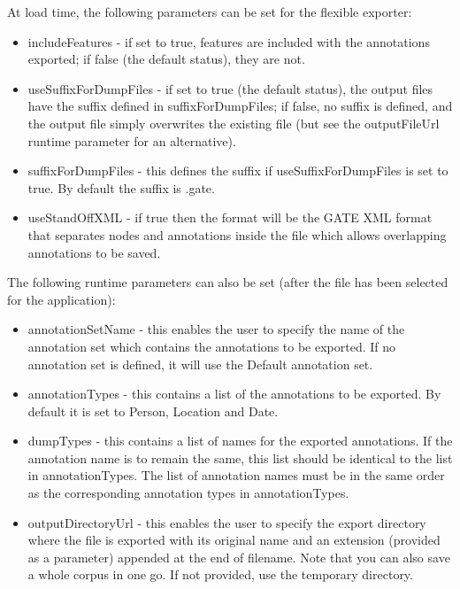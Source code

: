At load time, the following parameters can be set for the flexible
exporter:
\begin{itemize}
\item includeFeatures - if set to true, features are included with the
annotations exported; if false (the default status), they are not.

\item useSuffixForDumpFiles - if set to true  (the default status),
the output files have the suffix defined in suffixForDumpFiles; if
false, no suffix is defined, and the output file simply overwrites the
existing file (but see the outputFileUrl runtime parameter for an
alternative).

\item suffixForDumpFiles - this defines the suffix if
useSuffixForDumpFiles is set to true. By default the suffix is .gate.

\item useStandOffXML - if true then the format will be the GATE XML format
that separates nodes and annotations inside the file which allows
overlapping annotations to be saved.

\end{itemize}

The following runtime parameters can also be set (after the file has
been selected for the application):

\begin{itemize}

\item annotationSetName - this enables the user to specify the name of
the annotation set which contains the annotations to be exported. If
no annotation set is defined, it will use the Default annotation set.

\item annotationTypes - this contains a list of the annotations to be
exported. By default it is set to Person, Location and Date.

\item dumpTypes - this contains a list of names for the exported
annotations. If the annotation name is to remain the same, this list
should be identical to the list in annotationTypes. The list of
annotation names must be in the same order as the corresponding
annotation types in annotationTypes.

\item outputDirectoryUrl - this enables the user to specify the export directory
where the file is exported with its original name and an extension (provided as
a parameter) appended at the end of filename. Note that you can also save a
whole corpus in one go. If not provided, use the temporary directory.

\end{itemize}


